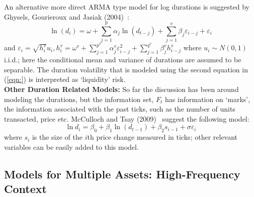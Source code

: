 An alternative more direct ARMA type model for log durations is suggested by Ghysels, Gourieroux and Jasiak (2004)~\cite{jasiak}:
\begin{equation}\label{eqn:21lnd}
	\ln{(d_i)} = \omega + \sum_{j=1}^p\alpha_j\ln{(d_{t-j})} + \sum_{j=1}^v\beta_j\varepsilon_{i-j} + \varepsilon_i
	\end{equation}
and $\varepsilon_i = \sqrt{h_i^v}u_i, h_i^v = \omega^v + \sum_{j=1}^{p^v}\alpha_j^v\varepsilon_{i-j}^2 + \sum_{j=1}^{q^v}\beta_j^vh_{i-j}^v$ where $u_i \sim N(0,1)$ i.i.d.; here the conditional mean and variance of durations are assumed to be separable. The duration volatility that is modeled using the second equation in (\ref{eqn:}) is interpreted as `liquidity' risk. \\


\noindent \textbf{Other Duration Related Models:} So far the discussion has been around modeling the durations, but the information set, $F_t$ has information on `marks', the information associated with the past ticks, such as the number of units transacted, price etc. McCulloch and Tsay (2009)~\cite{} suggest the following model:
	\begin{equation}\label{eqn:2lndi}
	\ln{d_i} = \beta_0 + \beta_1\ln{(d_{t-1})} + \beta_2s_{i-1} + \sigma\varepsilon_i
	\end{equation}
where $s_i$ is the size of the $i$th price change measured in ticks; other relevant variables can be easily added to this model.


\subsection{Models for Multiple Assets: High-Frequency Context}


